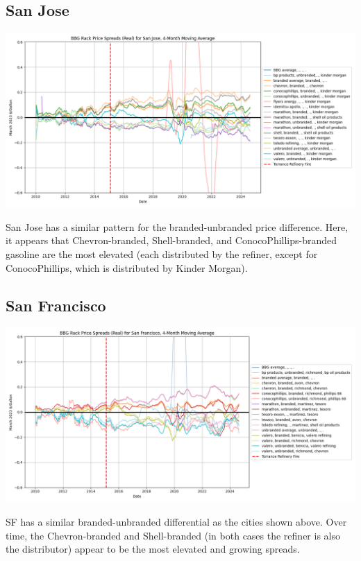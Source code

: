 \documentclass{article}
\begin{document}
\subsection{San Jose}
\centering \includegraphics[width=5.5in]{san jose_spread.png}\\
\raggedright San Jose has a similar pattern for the branded-unbranded price difference. Here, it appears that Chevron-branded, Shell-branded, and ConocoPhillips-branded gasoline are the most elevated (each distributed by the refiner, except for ConocoPhillips, which is distributed by Kinder Morgan). 

\subsection{San Francisco}
\centering \includegraphics[width=5.5in]{san francisco_spread.png}\\
\raggedright SF has a similar branded-unbranded differential as the cities shown above. Over time, the Chevron-branded and Shell-branded (in both cases the refiner is also the distributor) appear to be the most elevated and growing spreads.
\end{document}
